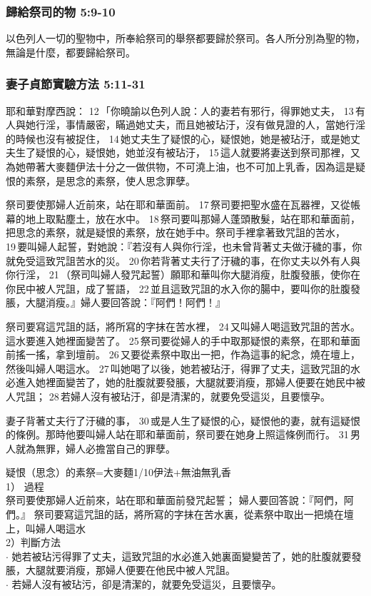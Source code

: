 \subsubsection{歸給祭司的物 5:9-10}
以色列人一切的聖物中，所奉給祭司的舉祭都要歸於祭司。各人所分別為聖的物，無論是什麼，都要歸給祭司。

\subsubsection{妻子貞節實驗方法 5:11-31}
耶和華對摩西說： 12 「你曉諭以色列人說：人的妻若有邪行，得罪她丈夫， 13 有人與她行淫，事情嚴密，瞞過她丈夫，而且她被玷汙，沒有做見證的人，當她行淫的時候也沒有被捉住， 14 她丈夫生了疑恨的心，疑恨她，她是被玷汙，或是她丈夫生了疑恨的心，疑恨她，她並沒有被玷汙， 15 這人就要將妻送到祭司那裡，又為她帶著大麥麵伊法十分之一做供物，不可澆上油，也不可加上乳香，因為這是疑恨的素祭，是思念的素祭，使人思念罪孽。

祭司要使那婦人近前來，站在耶和華面前。 17 祭司要把聖水盛在瓦器裡，又從帳幕的地上取點塵土，放在水中。 18 祭司要叫那婦人蓬頭散髮，站在耶和華面前，把思念的素祭，就是疑恨的素祭，放在她手中。祭司手裡拿著致咒詛的苦水， 19 要叫婦人起誓，對她說：『若沒有人與你行淫，也未曾背著丈夫做汙穢的事，你就免受這致咒詛苦水的災。 20 你若背著丈夫行了汙穢的事，在你丈夫以外有人與你行淫， 21 （祭司叫婦人發咒起誓）願耶和華叫你大腿消瘦，肚腹發脹，使你在你民中被人咒詛，成了誓語， 22 並且這致咒詛的水入你的腸中，要叫你的肚腹發脹，大腿消瘦。』婦人要回答說：『阿們！阿們！』

祭司要寫這咒詛的話，將所寫的字抹在苦水裡， 24 又叫婦人喝這致咒詛的苦水。這水要進入她裡面變苦了。 25 祭司要從婦人的手中取那疑恨的素祭，在耶和華面前搖一搖，拿到壇前。 26 又要從素祭中取出一把，作為這事的紀念，燒在壇上，然後叫婦人喝這水。 27 叫她喝了以後，她若被玷汙，得罪了丈夫，這致咒詛的水必進入她裡面變苦了，她的肚腹就要發脹，大腿就要消瘦，那婦人便要在她民中被人咒詛； 28 若婦人沒有被玷汙，卻是清潔的，就要免受這災，且要懷孕。

妻子背著丈夫行了汙穢的事， 30 或是人生了疑恨的心，疑恨他的妻，就有這疑恨的條例。那時他要叫婦人站在耶和華面前，祭司要在她身上照這條例而行。 31 男人就為無罪，婦人必擔當自己的罪孽。

\noindent
疑恨（思念）的素祭=大麥麵1/10伊法+無油無乳香\\
1） 過程\\
  祭司要使那婦人近前來，站在耶和華面前發咒起誓；
  婦人要回答說：『阿們，阿們。』
  祭司要寫這咒詛的話，將所寫的字抹在苦水裏，從素祭中取出一把燒在壇上，叫婦人喝這水\\
2）判斷方法 \\
   $\cdot${ 她若被玷污得罪了丈夫，這致咒詛的水必進入她裏面變變苦了，她的肚腹就要發脹，大腿就要消瘦，那婦人便要在他民中被人咒詛。}\\
   $\cdot${ 若婦人沒有被玷污，卻是清潔的，就要免受這災，且要懷孕。}


